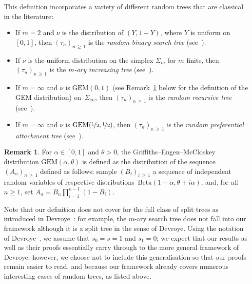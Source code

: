 \documentclass[10pt]{amsart}
\theoremstyle{definition}\newtheorem{defi}[theo]{Definition}\newtheorem{rema}[theo]{Remark}\newtheorem{exam}[theo]{Example}\newtheorem{exem}[theo]{Example}\newtheorem{nota}[theo]{Notation}
\newcommand{\GEM}{\mathrm{GEM}}
\newcommand{\Beta}{\mathrm{Beta}}
\begin{document}
This definition incorporates a variety of different random trees that are classical in the literature:
\begin{itemize}
\item If $m=2$ and $\nu$ is the distribution of $(Y, 1-Y)$, where $Y$ is uniform on $[0,1]$, then $(\tau_n)_{n\,\geq\,1}$ is the \emph{random binary search tree} (see~\cite[Table~1]{devroye-split}).
\item If $\nu$ is the uniform distribution on the simplex $\Sigma_m$ for $m$ finite, then $(\tau_n)_{n\,\geq\,1}$ is the \emph{$m$-ary increasing tree} (see~\cite[Table~1]{devroye-split}).
\item If $m=\infty$ and $\nu$ is $\GEM(0,1)$ (see Remark~\ref{rk:def_GEM} below for the definition of the GEM distribution) on~$\Sigma_{\infty}$, then $(\tau_n)_{n\,\geq\,1}$ is the \emph{random recursive tree} (see~\cite[Corollary~1.2]{Janson}).
\item If $m=\infty$ and $\nu$ is $\GEM(\nicefrac12,\nicefrac12)$, then $(\tau_n)_{n\,\geq\,1}$ is the \emph{random preferential attachment tree} (see~\cite[Corollary~1.3]{Janson}).
\end{itemize}

\begin{rema}\label{rk:def_GEM}
For $\alpha\in [0,1]$ and $\theta>0$, the Griffiths--Engen--McCloskey distribution $\GEM(\alpha, \theta)$ is defined as the distribution of the sequence $(A_n)_{n\,\geq\,1}$ defined as follows: sample $(B_i)_{i\,\geq\,1}$ a sequence of independent random variables of respective distributions~$\Beta(1-\alpha, \theta+i\alpha)$, and, for all $n\geq 1$, set $A_n = B_n\prod_{i=1}^{n-1}(1-B_i)$.
\end{rema}


Note that our definition does not cover for the full class of split trees as introduced in Devroye~\cite{devroye-split}: for example, the $m$-ary search tree does not fall into our framework although it is a split tree in the sense of Devroye. Using the notation of Devroye~\cite{devroye-split}, we assume that $s_0 = s = 1$ and $s_1 = 0$; we expect that our results as well as their proofs essentially carry through to the more general framework of Devroye; however, we choose not to include this generalisation so that our proofs remain easier to read, and because our framework already covers numerous interesting cases of random trees, as listed above.
\end{document}
